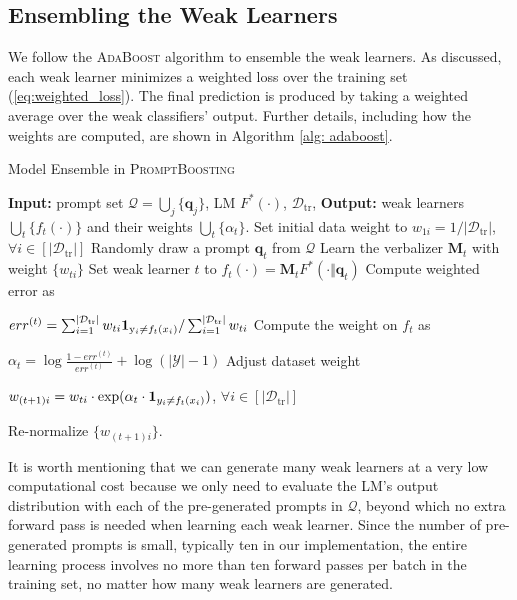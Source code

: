 \documentclass{article}
\theoremstyle{plain}
\theoremstyle{definition}
\theoremstyle{remark}
\newcommand{\alg}{\textsc{PromptBoosting}}
\begin{document}
\subsection{Ensembling the Weak Learners}
\label{subsec:ensemble}
We follow the \textsc{AdaBoost} algorithm to ensemble the weak learners. As discussed, each weak learner minimizes a weighted loss over the training set (\eqref{eq:weighted_loss}). The final prediction is produced by taking a weighted average over the weak classifiers' output. Further details, including how the weights are computed, are shown in Algorithm \ref{alg: adaboost}. 
\begin{minipage}{\linewidth}
\vspace{-1mm}
\begin{algorithm}[H]
\small
\caption{\small Model Ensemble in {\alg}}
\label{alg: adaboost}
\begin{algorithmic}[1]
\STATE \textbf{Input:} prompt set $\mathcal{Q}=\bigcup_j \{\bm q_j\}$, LM $F^{*}(\cdot)$, $\mathcal{D}_{\mathrm{tr}}$,
\STATE \textbf{Output:} weak learners $\bigcup_{t} \{f_{t}(\cdot)\}$ and their weights $\bigcup_{t} \{\alpha_{t}\}$.
\STATE Set initial data weight to $w_{1i} = 1 / |\mathcal{D}_{\mathrm{tr}}|$, $\forall i \in [|\mathcal{D}_{\mathrm{tr}}|]$
  \STATE Randomly draw a prompt $\bm q_{t}$ from $\mathcal{Q}$
  \STATE Learn the verbalizer $\bm M_t$ with weight $\{w_{ti}\}$
  \STATE Set weak learner $t$ to $f_t(\cdot) = \bm M_t F^*(\cdot \Vert \bm q_t)$
  \STATE Compute weighted error as

  $err^{(t)} = \sum_{i=1}^{|\mathcal{D}_{\mathrm{tr}}|}w_{ti}\bm{1}_{\mathrm y_{i}\ne f_t(x_{i})}/\sum_{i=1}^{|\mathcal{D}_{\mathrm{tr}}|}w_{ti}$
  \STATE Compute the weight on $f_t$ as
  
  $\alpha_{t} = \log \frac{1-err^{(t)}}{err^{(t)}} + \log (|\mathcal{Y}|-1)$
  \STATE Adjust dataset weight
  
  $w_{(t+1)i} = w_{ti}\cdot \exp(\alpha_{t}\cdot \bm{1}_{y_{i}\ne f_{t}(x_{i})})$, $\forall i \in [|\mathcal{D}_{\mathrm{tr}}|]$
  
  \STATE Re-normalize $\{w_{(t+1)i}\}$.
  
  \ENDFOR
\end{algorithmic}
\end{algorithm}
\end{minipage}

It is worth mentioning that we can generate many weak learners at a very low computational cost because we only need to evaluate the LM's output distribution with each of the pre-generated prompts in $\mathcal{Q}$, beyond which no extra forward pass is needed when learning each weak learner. Since the number of pre-generated prompts is small, typically ten in our implementation, the entire learning process involves no more than ten forward passes per batch in the training set, no matter how many weak learners are generated.
\end{document}

